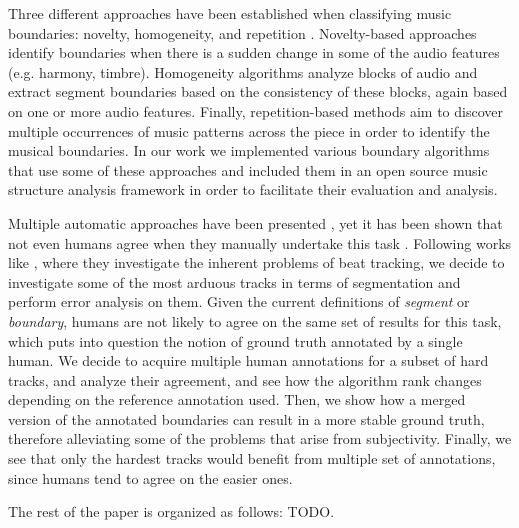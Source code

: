 \documentclass{article}
\begin{document}
Three different approaches have been established when classifying music boundaries: novelty, homogeneity, and repetition \cite{Paulus2010}. 
Novelty-based approaches identify boundaries when there is a sudden change in some of the audio features (e.g. harmony, timbre).
Homogeneity algorithms analyze blocks of audio and extract segment boundaries based on the consistency of these blocks, again based on one or more audio features.
Finally, repetition-based methods aim to discover multiple occurrences of music patterns across the piece in order to identify the musical boundaries.
In our work we implemented various boundary algorithms that use some of these approaches and included them in an open source music structure analysis framework in order to facilitate their evaluation and analysis.

Multiple automatic approaches have been presented \cite{Paulus2010}, yet it has been shown that not even humans agree when they manually undertake this task \cite{Serra2013}.
Following works like \cite{Grosche2010}, where they investigate the inherent problems of beat tracking, we decide to investigate some of the most arduous tracks in terms of segmentation and perform error analysis on them.
Given the current definitions of \emph{segment} or \emph{boundary}, humans are not likely to agree on the same set of results for this task, which puts into question the notion of ground truth annotated by a single human.
We decide to acquire multiple human annotations for a subset of hard tracks, and analyze their agreement, and see how the algorithm rank changes depending on the reference annotation used.
Then, we show how a merged version of the annotated boundaries can result in a more stable ground truth, therefore alleviating some of the problems that arise from subjectivity.
Finally, we see that only the hardest tracks would benefit from multiple set of annotations, since humans tend to agree on the easier ones.

The rest of the paper is organized as follows: TODO.


\end{document}
